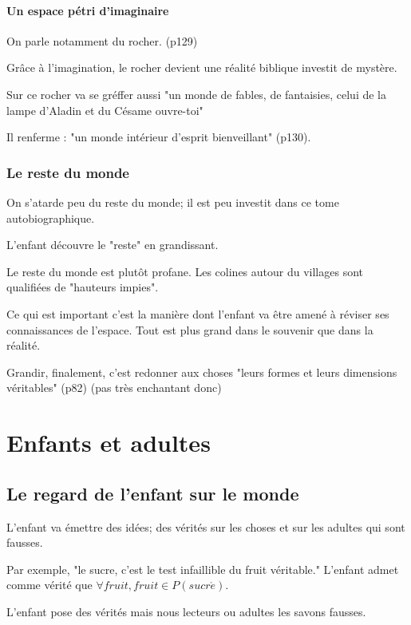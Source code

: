 \documentclass[a4paper, 11pt, hidelinks]{article}
\newcommand{\bs}{\bigskip}
\begin{document}
\paragraph{Un espace pétri d'imaginaire}

On parle notamment du rocher. (p129) 

Grâce à l'imagination, le rocher devient une réalité biblique investit de mystère.


Sur ce rocher va se gréffer aussi "un monde de fables, de fantaisies, celui de la lampe d'Aladin et du Césame ouvre-toi"


Il renferme : "un monde intérieur d'esprit bienveillant" (p130).


\subsubsection{Le reste du monde}


On s'atarde peu du reste du monde; il est peu investit dans ce tome autobiographique.

L'enfant découvre le "reste" en grandissant.
\bs


Le reste du monde est plutôt profane. Les colines autour du villages sont qualifiées de "hauteurs impies".

Ce qui est important c'est la manière dont l'enfant va être amené à réviser ses connaissances 
de l'espace. Tout est plus grand dans le souvenir que dans la réalité.


Grandir, finalement, c'est redonner aux choses "leurs formes et leurs dimensions véritables" (p82) (pas très enchantant donc)


\section{Enfants et adultes}

\subsection{Le regard de l'enfant sur le monde}


L'enfant va émettre des idées; des vérités sur les choses et sur les adultes qui sont fausses.

Par exemple, "le sucre, c'est le test infaillible du fruit véritable." L'enfant admet comme vérité que $\forall fruit, fruit \in P(sucr\acute{e})$.

\bs

L'enfant pose des vérités mais nous lecteurs ou adultes les savons fausses.
\bs
\end{document}
